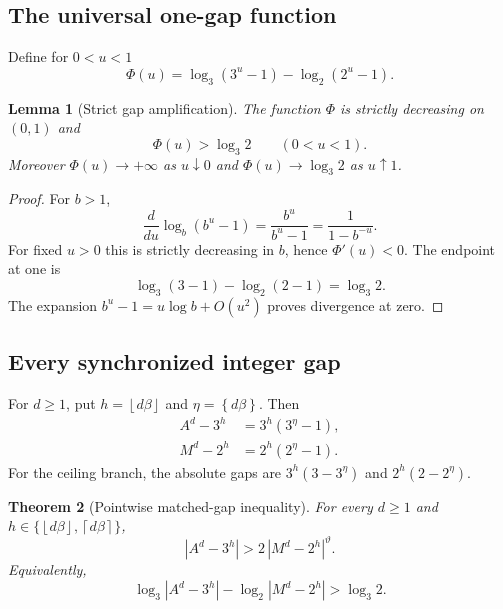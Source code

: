 \documentclass[11pt,oneside]{article}
\newtheorem{theorem}{Theorem}[section]
\newtheorem{lemma}[theorem]{Lemma}
\theoremstyle{definition}
\theoremstyle{remark}
\newcommand{\floor}[1]{\left\lfloor #1\right\rfloor}
\newcommand{\ceil}[1]{\left\lceil #1\right\rceil}
\newcommand{\fract}[1]{\left\{#1\right\}}
\newcommand{\thetaq}{\vartheta}
\begin{document}
\subsection{The universal one-gap function}

Define for $0<u<1$
\begin{equation}
 \Phi(u)=\log_3(3^u-1)-\log_2(2^u-1).
 \label{eq:Phi}
\end{equation}

\begin{lemma}[Strict gap amplification]
\label{lem:Phi}
The function $\Phi$ is strictly decreasing on $(0,1)$ and
\begin{equation}
 \Phi(u)>\log_3 2\qquad(0<u<1).
 \label{eq:Phi-lower}
\end{equation}
Moreover $\Phi(u)\to+\infty$ as $u\downarrow0$ and
$\Phi(u)\to\log_3 2$ as $u\uparrow1$.
\end{lemma}

\begin{proof}
For $b>1$,
\[
 \frac{d}{du}\log_b(b^u-1)=\frac{b^u}{b^u-1}
 =\frac1{1-b^{-u}}.
\]
For fixed $u>0$ this is strictly decreasing in $b$, hence $\Phi'(u)<0$.  The endpoint at one is
\[
 \log_3(3-1)-\log_2(2-1)=\log_3 2.
\]
The expansion $b^u-1=u\log b+O(u^2)$ proves divergence at zero.
\end{proof}

\subsection{Every synchronized integer gap}

For $d\ge1$, put $h=\floor{d\beta}$ and $\eta=\fract{d\beta}$.  Then
\begin{align}
 A^d-3^h&=3^h(3^\eta-1),\\
 M^d-2^h&=2^h(2^\eta-1).
\end{align}
For the ceiling branch, the absolute gaps are
$3^h(3-3^\eta)$ and $2^h(2-2^\eta)$.

\begin{theorem}[Pointwise matched-gap inequality]
\label{thm:pointwise-gap}
For every $d\ge1$ and
$h\in\{\floor{d\beta},\ceil{d\beta}\}$,
\begin{equation}
 |A^d-3^h|>2\,|M^d-2^h|^{\thetaq}.
 \label{eq:pointwise-gap}
\end{equation}
Equivalently,
\begin{equation}
 \log_3|A^d-3^h|-\log_2|M^d-2^h|>\log_3 2.
 \label{eq:pointwise-log}
\end{equation}
\end{theorem}
\end{document}
